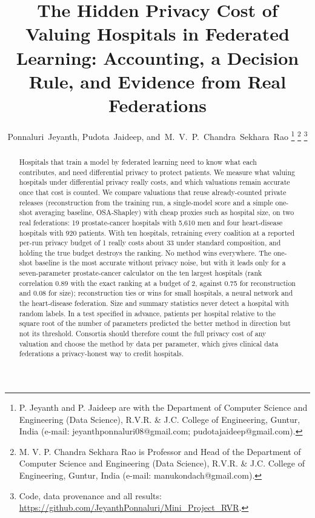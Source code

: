 \documentclass[journal]{IEEEtran}
\begin{document}
\title{The Hidden Privacy Cost of Valuing Hospitals in Federated Learning: Accounting, a Decision Rule, and Evidence from Real Federations}

\author{Ponnaluri~Jeyanth,
        Pudota~Jaideep,
        and~M.~V.~P.~Chandra~Sekhara~Rao%
\thanks{P. Jeyanth and P. Jaideep are with the Department of Computer Science and Engineering (Data Science), R.V.R. \& J.C. College of Engineering, Guntur, India (e-mail: jeyanthponnaluri08@gmail.com; pudotajaideep@gmail.com).}%
\thanks{M. V. P. Chandra Sekhara Rao is Professor and Head of the Department of Computer Science and Engineering (Data Science), R.V.R. \& J.C. College of Engineering, Guntur, India (e-mail: manukondach@gmail.com).}%
\thanks{Code, data provenance and all results: \protect\url{https://github.com/JeyanthPonnaluri/Mini_Project_RVR}.}}

\markboth{}{}

\maketitle

\begin{abstract}
Hospitals that train a model by federated learning need to know what each contributes, and need differential privacy to protect patients. We measure what valuing hospitals under differential privacy really costs, and which valuations remain accurate once that cost is counted. We compare valuations that reuse already-counted private releases (reconstruction from the training run, a single-model score and a simple one-shot averaging baseline, OSA-Shapley) with cheap proxies such as hospital size, on two real federations: 19 prostate-cancer hospitals with 5,610 men and four heart-disease hospitals with 920 patients. With ten hospitals, retraining every coalition at a reported per-run privacy budget of 1 really costs about 33 under standard composition, and holding the true budget destroys the ranking. No method wins everywhere. The one-shot baseline is the most accurate without privacy noise, but with it leads only for a seven-parameter prostate-cancer calculator on the ten largest hospitals (rank correlation 0.89 with the exact ranking at a budget of 2, against 0.75 for reconstruction and 0.08 for size); reconstruction ties or wins for small hospitals, a neural network and the heart-disease federation. Size and summary statistics never detect a hospital with random labels. In a test specified in advance, patients per hospital relative to the square root of the number of parameters predicted the better method in direction but not its threshold. Consortia should therefore count the full privacy cost of any valuation and choose the method by data per parameter, which gives clinical data federations a privacy-honest way to credit hospitals.
\end{abstract}
\end{document}
